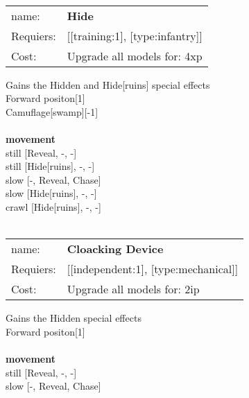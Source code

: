 \ \\
\begin{tabular}{ll}
name: & {\bf Hide } \\
Requiers: & [[training:1], [type:infantry]] \\
Cost: & Upgrade all models for: 4xp \\
\end{tabular}

Gains the Hidden and Hide[ruins] special effects\\ 
Forward positon[1]\\ 
Camuflage[swamp][-1]\\ 








\ \\ {\bf movement } \\
still [Reveal, -, -] \\
still [Hide[ruins], -, -] \\
slow [-, Reveal, Chase] \\
slow [Hide[ruins], -, -] \\
crawl [Hide[ruins], -, -] \\

\ \\
\begin{tabular}{ll}
name: & {\bf Cloacking Device } \\
Requiers: & [[independent:1], [type:mechanical]] \\
Cost: & Upgrade all models for: 2ip \\
\end{tabular}

Gains the Hidden special effects\\ 
Forward positon[1]\\ 








\ \\ {\bf movement } \\
still [Reveal, -, -] \\
slow [-, Reveal, Chase] \\

